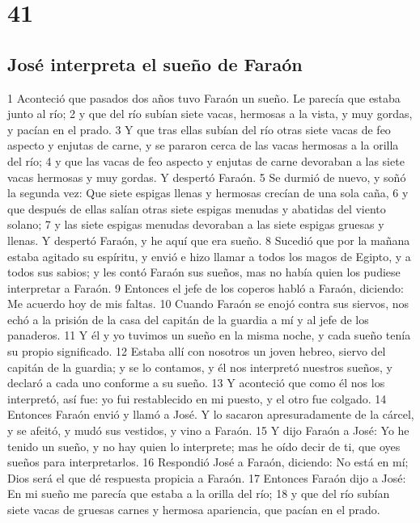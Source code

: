 \chapter{41}

\section*{José interpreta el sueño de Faraón}

1 Aconteció que pasados dos años tuvo Faraón un sueño. Le parecía que estaba junto al río;
2 y que del río subían siete vacas, hermosas a la vista, y muy gordas, y pacían en el prado.
3 Y que tras ellas subían del río otras siete vacas de feo aspecto y enjutas de carne, y se pararon cerca de las vacas hermosas a la orilla del río;
4 y que las vacas de feo aspecto y enjutas de carne devoraban a las siete vacas hermosas y muy gordas. Y despertó Faraón.
5 Se durmió de nuevo, y soñó la segunda vez: Que siete espigas llenas y hermosas crecían de una sola caña,
6 y que después de ellas salían otras siete espigas menudas y abatidas del viento solano;
7 y las siete espigas menudas devoraban a las siete espigas gruesas y llenas. Y despertó Faraón, y he aquí que era sueño.
8 Sucedió que por la mañana estaba agitado su espíritu, y envió e hizo llamar a todos los magos de Egipto, y a todos sus sabios; y les contó Faraón sus sueños, mas no había quien los pudiese interpretar a Faraón.
9 Entonces el jefe de los coperos habló a Faraón, diciendo: Me acuerdo hoy de mis faltas.
10 Cuando Faraón se enojó contra sus siervos, nos echó a la prisión de la casa del capitán de la guardia a mí y al jefe de los panaderos.
11 Y él y yo tuvimos un sueño en la misma noche, y cada sueño tenía su propio significado.
12 Estaba allí con nosotros un joven hebreo, siervo del capitán de la guardia; y se lo contamos, y él nos interpretó nuestros sueños, y declaró a cada uno conforme a su sueño.
13 Y aconteció que como él nos los interpretó, así fue: yo fui restablecido en mi puesto, y el otro fue colgado.
14 Entonces Faraón envió y llamó a José. Y lo sacaron apresuradamente de la cárcel, y se afeitó, y mudó sus vestidos, y vino a Faraón.
15 Y dijo Faraón a José: Yo he tenido un sueño, y no hay quien lo interprete; mas he oído decir de ti, que oyes sueños para interpretarlos.
16 Respondió José a Faraón, diciendo: No está en mí; Dios será el que dé respuesta propicia a Faraón.
17 Entonces Faraón dijo a José: En mi sueño me parecía que estaba a la orilla del río;
18 y que del río subían siete vacas de gruesas carnes y hermosa apariencia, que pacían en el prado.
